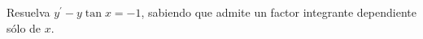 Resuelva $y^{\prime}-y\tan x=-1$, sabiendo que admite un factor integrante dependiente sólo de $x$.
